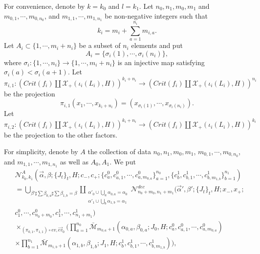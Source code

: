 \documentclass{amsart}
\numberwithin{equation}{section}
\numberwithin{figure}{section}
\begin{document}
	For convenience, denote by $k = k_{0}$ and $l = k_{1}$. Let $n_{0}, n_{1}, m_{0}, m_{1}$ and $m_{0, 1}, \cdots, m_{0, n_{0}}$, and $m_{1, 1}, \cdots, m_{1, n_{1}}$ be non-negative integers such that
\begin{equation*}
k_{i} = m_{i} + \sum_{a=1}^{n_{i}}m_{i, a}.
\end{equation*}
Let $A_{i} \subset \{1, \cdots, m_{i}+n_{i}\}$ be a subset of $n_{i}$ elements and put
\begin{equation}
A_{i} = \{\sigma_{i}(1), \cdots, \sigma_{i}(n_{i})\},
\end{equation}
where $\sigma_{i}: \{1, \cdots, n_{i}\} \to \{1, \cdots, m_{i} + n_{i}\}$ is an injective map satisfying $\sigma_{i}(a) < \sigma_{i}(a+1)$.
Let $\pi_{i, 1}: (Crit(f_{i}) \coprod \mathcal{X}_{+}(\iota_{i}(L_{i}), H))^{k_{i}+n_{i}} \to (Crit(f_{i}) \coprod \mathcal{X}_{+}(\iota_{i}(L_{i}), H))^{n_{i}}$ be the projection
\begin{equation*}
\pi_{i, 1}(x_{1}, \cdots, x_{k_{i}+n_{i}}) = (x_{\sigma_{i}(1)}, \cdots, x_{\sigma_{i}(n_{i})}).
\end{equation*}
Let $\pi_{i, 2}: (Crit(f_{i}) \coprod \mathcal{X}_{+}(\iota_{i}(L_{i}), H))^{k_{i}+n_{i}} \to (Crit(f_{i}) \coprod \mathcal{X}_{+}(\iota_{i}(L_{i}), H))^{k_{i}}$ be the projection to the other factors. \par
	For simplicity, denote by $A$ the collection of data $n_{0}, n_{1}, m_{0}, m_{1}$, $m_{0, 1}, \cdots, m_{0, n_{0}}$, and $m_{1, 1}, \cdots, m_{1, n_{1}}$ as well as $A_{0}, A_{1}$. We put
\begin{equation} \label{moduli spaces of unbroken stable Floer trajectories}
\begin{split}
&\mathcal{N}^{A}_{k_{0}, k_{1}}(\vec{\alpha}, \beta; \{J_{t}\}_{t}, H; c_{-}, c_{+}; \{c^{0}_{a}, c^{0}_{a, 1}, \cdots, c^{0}_{a, m_{0, a}}\}_{a=1}^{n_{0}}, \{c^{1}_{b}, c^{1}_{b, 1}, \cdots, c^{1}_{b, m_{1, b}}\}_{b=1}^{n_{1}})\\
&= \bigcup_{\beta' \sharp \sum \beta_{0, a} \sharp \sum \beta_{1, b} = \beta} \coprod_{\substack{\alpha'_{0} \cup \bigcup_{a} \alpha_{0, a} = \alpha_{0}\\ \alpha'_{1} \cup \bigcup_{b} \alpha_{1, b} = \alpha_{1}}} \mathcal{N}_{n_{0}+m_{0}, n_{1}+m_{1}}^{dec}(\vec{\alpha}', \beta'; \{J_{t}\}_{t}, H; x_{-}, x_{+};\\
&c^{0}_{1}, \cdots, c^{0}_{n_{0}+m_{0}}, c^{1}_{1}, \cdots, c^{1}_{n_{1}+m_{1}})\\
& \times_{(\pi_{0, 1}, \pi_{1, 1}) \circ ev, \vec{ev}_{0}}
(\prod_{a=1}^{n_{0}} \bar{\mathcal{M}}_{m_{0, a}+1}(\alpha_{0, a}, \beta_{0, a}; J_{0}, H; c^{0}_{a}, c^{0}_{a, 1}, \cdots, c^{0}_{a, m_{0, a}})\\
&\times \prod_{b=1}^{n_{1}} \bar{\mathcal{M}}_{m_{1, b}+1}(\alpha_{1, b}, \beta_{1,b}; J_{1}, H; c^{1}_{b}, c^{1}_{b, 1}, \cdots, c^{1}_{b, m_{1, b}})),
\end{split}
\end{equation}
\end{document}
